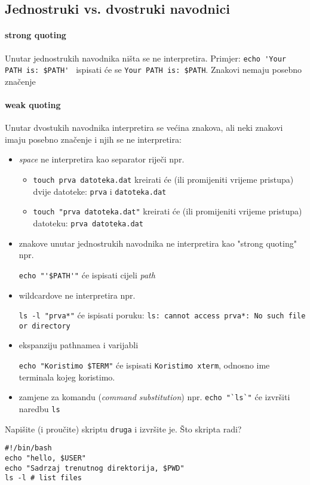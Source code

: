 \subsection*{Jednostruki vs. dvostruki navodnici}
\paragraph{strong quoting} Unutar jednostrukih navodnika ništa se ne interpretira. Primjer: \lstinline!echo 'Your PATH is: $PATH' ! ispisati će se \lstinline!Your PATH is: $PATH!. 
Znakovi nemaju posebno značenje
\paragraph{weak quoting} Unutar dvostukih navodnika interpretira se većina znakova, ali neki znakovi imaju posebno značenje i njih se ne interpretira:
\begin{itemize}
 \item \textit{space} ne interpretira kao separator riječi npr.
 
\begin{itemize}
\item 
 \texttt{touch prva datoteka.dat} kreirati će (ili promijeniti vrijeme pristupa) dvije datoteke: \texttt{prva} i \texttt{datoteka.dat} 
 
\item  \texttt{touch "prva datoteka.dat"} kreirati će (ili promijeniti vrijeme pristupa) datoteku: \texttt{prva datoteka.dat}                                                                                                                       \end{itemize}


 \item znakove unutar jednostrukih navodnika ne interpretira kao "strong quoting" npr.
 
\lstinline!echo "'$PATH'"! će ispisati cijeli \textit{path} 
 \item wildcardove ne interpretira npr.
 
 \lstinline!ls -l "prva*"! će ispisati poruku: \texttt{ls: cannot access prva*: No such file or directory}
 \item ekspanziju pathnamea i varijabli
 
\lstinline!echo "Koristimo $TERM"! će ispisati \texttt{Koristimo xterm}, odnosno ime terminala kojeg koristimo.

\item zamjene za komandu (\textit{command substitution}) npr. 
\lstinline!echo "`ls`"! će izvršiti naredbu \texttt{ls} 
\end{itemize}
\begin{zadatak}
Napišite (i proučite) skriptu \texttt{druga} i izvršite je. Što skripta radi?
\begin{lstlisting}
#!/bin/bash
echo "hello, $USER"
echo "Sadrzaj trenutnog direktorija, $PWD"
ls -l # list files
\end{lstlisting}
\end{zadatak}



